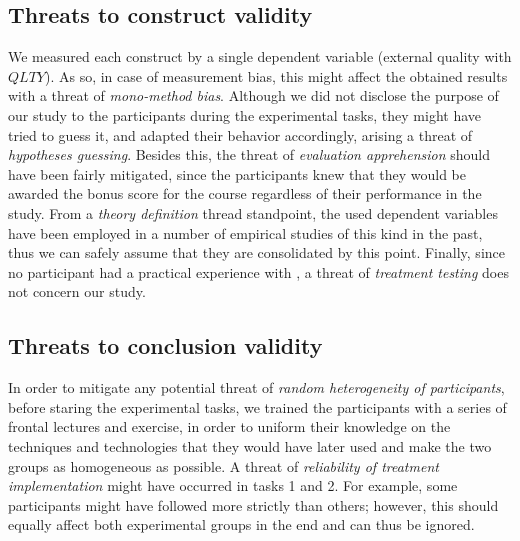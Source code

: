 \subsection{Threats to construct validity}
We measured each construct by a single dependent variable (\eg external quality with $QLTY$). As so, in case of measurement bias,
this might affect the obtained results with a threat of \textit{mono-method bias}. 
Although we did not disclose the purpose of our study to the participants during the experimental tasks, they might have tried to guess it, and adapted their behavior accordingly, arising a threat of \textit{hypotheses guessing}. 
Besides this, the threat of \textit{evaluation apprehension} should have been fairly mitigated, since the participants knew that they would be awarded the bonus score for the course regardless of their performance in the study.
From a \textit{theory definition} thread standpoint, the used dependent variables have been employed in a number of empirical studies of this kind in the past, thus we can safely assume that they are consolidated by this point. Finally, since no participant had a practical experience with \tdd, a threat of \textit{treatment testing} does not concern our study.

\subsection{Threats to conclusion validity}
In order to mitigate any potential threat of \textit{random heterogeneity of participants}, before staring the experimental tasks, we trained the participants with a series of frontal lectures and exercise, in order to uniform their knowledge on the techniques and technologies that they would have later used and make the two groups as homogeneous as possible. 
A threat of \textit{reliability of treatment implementation} might have occurred in tasks 1 and 2. For example, some participants might have followed \tdd more strictly than others; however, this should equally affect both experimental groups in the end and can thus be ignored. 
